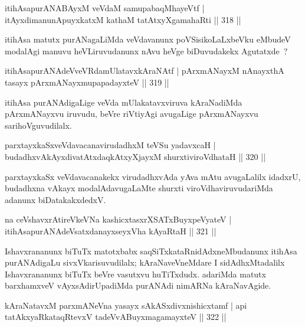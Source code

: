 
\begin{shl}
itihAsapurANABAyxM veVdaM samupabaqMhayeVtf |
itAyxdimanunA\s puyxkatxM kathaM tatAtxyXgamahaRti \hfill || 318 ||
\end{shl}

\begin{artha}
itihAsa matutx purANagaLiMda veVdavanunx poVSisikoLaLxbeVku eMbudeV modalAgi manuvu heVLiruvudanunx nAvu heVge biDuvudakekx Agutatxde~?
\end{artha}

\begin{shl}
itihAsapurANAdeVveVRdamUlatavxkAraNAtf |
pArxmANayxM nAnayxthA tasayx pArxmANayxmupapadayxteV \hfill || 319 ||
\end{shl}

\begin{artha}
itihAsa purANAdigaLige veVda mUlakatavxviruva kAraNadiMda pArxmANayxvu iruvudu, beVre riVtiyAgi avugaLige pArxmANayxvu sarihoVguvudilalx.
\end{artha}

\begin{shl}
parxtayxkaSxveVdavacanavirudadhxM teVSu yadavxcaH |
budadhxvAkAyxdivatAtxdaqkAtxyXjayxM shurxtiviroVdhataH \hfill || 320 ||
\end{shl}

\begin{artha}
parxtayxkaSx veVdavacanakekx virudadhxvAda yAva mAtu avugaLalilx idadxrU, budadhxna vAkayx modalAdavugaLaMte shurxti viroVdhaviruvudariMda adanunx biDatakakxdedxV.
\end{artha}

\begin{shl}
na ceVshavxrAtireVkeVNa kashicxtasxrXSATx\s BuyxpeVyateV |
itihAsapurANAdeVsatxdanayxseyxVha kAyaRtaH \hfill || 321 ||
\end{shl}

\begin{artha}
Ishavxrananunx biTuTx matotxbabx saqSiTxkataRnidAdxneMbudanunx itihAsa purANAdigaLu sivxVkarisuvudilalx; kAraNaveVneMdare I sidAdhxMtadalilx Ishavxrananunx biTuTx beVre vasutxvu huTiTxdudx. adariMda matutx barxhamxveV vAyxsAdirUpadiMda purANAdi nimARNa kAraNavAgide.
\end{artha}

\begin{shl}
kAraNatavxM parxmANeVna yasayx sAkASxdivxnishicxtamf |
api tatAkxyaRkataqRtevxV tadeVvABuyxmagamayxteV \hfill || 322 ||
\end{shl}

